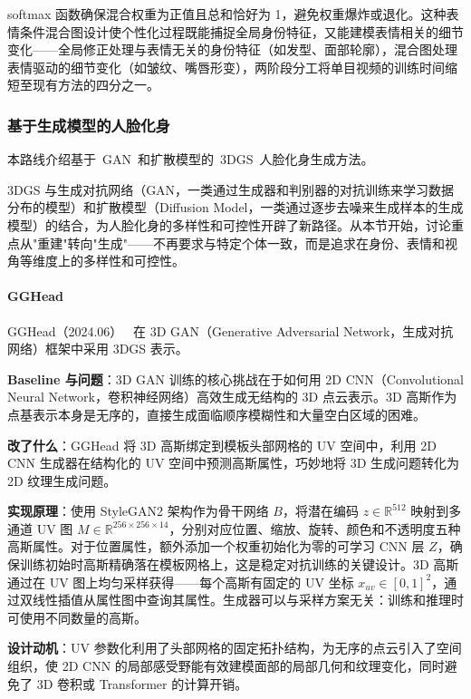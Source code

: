 softmax 函数确保混合权重为正值且总和恰好为 1，避免权重爆炸或退化。这种表情条件混合图设计使个性化过程既能捕捉全局身份特征，又能建模表情相关的细节变化——全局修正处理与表情无关的身份特征（如发型、面部轮廓），混合图处理表情驱动的细节变化（如皱纹、嘴唇形变），两阶段分工将单目视频的训练时间缩短至现有方法的四分之一。

\subsubsection{基于生成模型的人脸化身}

本路线介绍基于~GAN~和扩散模型的~3DGS~人脸化身生成方法。

3DGS 与生成对抗网络（GAN，一类通过生成器和判别器的对抗训练来学习数据分布的模型）和扩散模型（Diffusion Model，一类通过逐步去噪来生成样本的生成模型）的结合，为人脸化身的多样性和可控性开辟了新路径。从本节开始，讨论重点从"重建"转向"生成"——不再要求与特定个体一致，而是追求在身份、表情和视角等维度上的多样性和可控性。

\paragraph{GGHead}

GGHead（2024.06）~\cite{2406_09377} 在 3D GAN（Generative Adversarial Network，生成对抗网络）框架中采用 3DGS 表示。

\textbf{Baseline 与问题}：3D GAN 训练的核心挑战在于如何用 2D CNN（Convolutional Neural Network，卷积神经网络）高效生成无结构的 3D 点云表示。3D 高斯作为点基表示本身是无序的，直接生成面临顺序模糊性和大量空白区域的困难。

\textbf{改了什么}：GGHead 将 3D 高斯绑定到模板头部网格的 UV 空间中，利用 2D CNN 生成器在结构化的 UV 空间中预测高斯属性，巧妙地将 3D 生成问题转化为 2D 纹理生成问题。

\textbf{实现原理}：使用 StyleGAN2 架构作为骨干网络 $B$，将潜在编码 $z \in \mathbb{R}^{512}$ 映射到多通道 UV 图 $M \in \mathbb{R}^{256 \times 256 \times 14}$，分别对应位置、缩放、旋转、颜色和不透明度五种高斯属性。对于位置属性，额外添加一个权重初始化为零的可学习 CNN 层 $Z$，确保训练初始时高斯精确落在模板网格上，这是稳定对抗训练的关键设计。3D 高斯通过在 UV 图上均匀采样获得——每个高斯有固定的 UV 坐标 $x_{uv} \in [0,1]^2$，通过双线性插值从属性图中查询其属性。生成器可以与采样方案无关：训练和推理时可使用不同数量的高斯。

\textbf{设计动机}：UV 参数化利用了头部网格的固定拓扑结构，为无序的点云引入了空间组织，使 2D CNN 的局部感受野能有效建模面部的局部几何和纹理变化，同时避免了 3D 卷积或 Transformer 的计算开销。

